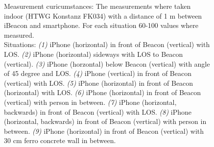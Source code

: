 \begin{figure}
\centering

\caption {Measurement curicumstances: The measurements where taken indoor (HTWG Konstanz FK034) with a distance of 1 m between iBeacon and smartphone. For each situation 60-100 values where measured.\\
  Situations:
  \emph{(1)} iPhone (horizontal) in front of Beacon (vertical) with \acs{LOS}.
  \emph{(2)} iPhone (horizontal) sideways with \acs{LOS} to  Beacon (vertical).
  \emph{(3)} iPhone (horzontal) below Beacon (vertical) with angle of 45 degree and \acs{LOS}.
  \emph{(4)} iPhone (vertical) in front of Beacon (vertical) with \acs{LOS}.
  \emph{(5)} iPhone (horizontal) in front of Beacon (horizontal) with \acs{LOS}.
  \emph{(6)} iPhone (horizontal) in front of Beacon (vertical) with person in between.
  \emph{(7)} iPhone (horizontal, backwards) in front of Beacon (vertical) with \acs{LOS}.
  \emph{(8)} iPhone (horizontal, backwards) in front of Beacon (vertical) with person in between.
  \emph{(9)} iPhone (horizontal) in front of Beacon (vertical) with 30 cm ferro concrete wall in between.
}
\end{figure}


